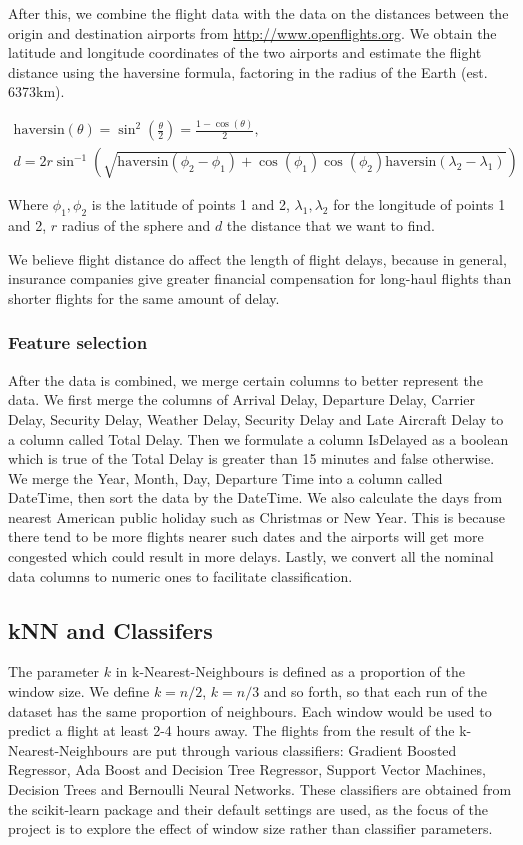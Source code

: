 \documentclass[letterpaper,11pt]{article}
\begin{document}
After this, we combine the flight data with the data on the distances between the origin and destination airports from \url{http://www.openflights.org}. We obtain the latitude and longitude coordinates of the two airports and estimate the flight distance using the haversine formula, factoring in the radius of the Earth (est. 6373km).

\begin{multline}
\scriptstyle \text{haversin}(\theta)=\sin^2\left(\frac\theta2\right)=\frac{1-\cos(\theta)}2, \\
\scriptstyle d=2r\sin^{-1}\left(\sqrt{\text{haversin}(\phi_2-\phi_1)+\cos(\phi_1)\cos(\phi_2)\text{haversin}(\lambda_2-\lambda_1)}\right)
\end{multline}

Where $\phi_1, \phi_2$ is the latitude of points 1 and 2, $\lambda_1, \lambda_2$ for the longitude of points 1 and 2, $r$ radius of the sphere and $d$ the distance that we want to find.

We believe flight distance do affect the length of flight delays, because in general, insurance companies give greater financial compensation for long-haul flights than shorter flights for the same amount of delay.

\subsubsection{Feature selection}
After the data is combined, we merge certain columns to better represent the data. We first merge the columns of Arrival Delay, Departure Delay, Carrier Delay, Security Delay, Weather Delay, Security Delay and Late Aircraft Delay to a column called Total Delay. Then we formulate a column IsDelayed as a boolean which is true of the Total Delay is greater than 15 minutes and false otherwise. We merge the Year, Month, Day, Departure Time into a column called DateTime, then sort the data by the DateTime. We also calculate the days from nearest American public holiday such as Christmas or New Year. This is because there tend to be more flights nearer such dates and the airports will get more congested which could result in more delays. Lastly, we convert all the nominal data columns to numeric ones to facilitate classification. 

\subsection{kNN and Classifers}
The parameter $k$ in k-Nearest-Neighbours is defined as a proportion of the window size. We define $k=n/2$, $k=n/3$ and so forth, so that each run of the dataset has the same proportion of neighbours. Each window would be used to predict a flight at least 2-4 hours away.
The flights from the result of the k-Nearest-Neighbours are put through various classifiers: Gradient Boosted Regressor, Ada Boost and Decision Tree Regressor, Support Vector Machines, Decision Trees and Bernoulli Neural Networks. These classifiers are obtained from the scikit-learn package and their default settings are used, as the focus of the project is to explore the effect of window size rather than classifier parameters. 
\end{document}
